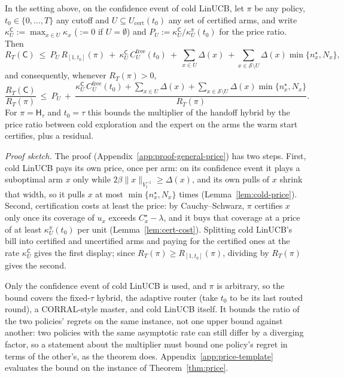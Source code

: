 \documentclass[anon]{alt2027} %
\newcommand{\Cold}{\mathsf{C}}
\newcommand{\Hyb}{\mathsf{H}}
\begin{document}
\begin{theorem}
\label{thm:general-price}
In the setting above, on the confidence event of cold LinUCB, let $\pi$ be
any policy, $t_0\in\{0,\dots,T\}$ any cutoff and $U\subseteq
U_{\mathrm{cert}}(t_0)$ any set of certified arms, and write
$\kappa^{\Cold}_U:=\max_{x\in U}\kappa_x$ ($:=0$ if $U=\emptyset$) and
$P_U:=\kappa^{\Cold}_U/\kappa^\pi_U(t_0)$ for the price ratio. Then
\[
R_T(\Cold)\ \le\ P_U\,R_{[1,t_0]}(\pi)\ +\ \kappa^{\Cold}_U\,C^{\mathrm{free}}_U(t_0)\ +\ \sum_{x\in U}\Delta(x)
\ +\sum_{x\in \mathcal S\setminus U}\Delta(x)\min\{n^\star_x,N_x\},
\]
and consequently, whenever $R_T(\pi)>0$,
\begin{equation}
\label{eq:general-price}
\frac{R_T(\Cold)}{R_T(\pi)}\ \le\ P_U\ +\
\frac{\kappa^{\Cold}_U\,C^{\mathrm{free}}_U(t_0)+\sum_{x\in U}\Delta(x)+\sum_{x\in \mathcal S\setminus U}\Delta(x)\min\{n^\star_x,N_x\}}{R_T(\pi)} .
\end{equation}
For $\pi=\Hyb_\tau$ and $t_0=\tau$ this bounds the multiplier of the handoff
hybrid by the price ratio between cold exploration and the expert on the
arms the warm start certifies, plus a residual.
\end{theorem}

\emph{Proof sketch.} The proof (Appendix~\ref{app:proof-general-price}) has
two steps. First, cold LinUCB pays its own price, once per arm: on its
confidence event it plays a suboptimal arm $x$ only while
$2\beta\|x\|_{V_t^{-1}}\ge\Delta(x)$, and its own pulls of $x$ shrink that
width, so it pulls $x$ at most $\min\{n^\star_x,N_x\}$ times
(Lemma~\ref{lem:cold-price}). Second, certification costs at least the price:
by Cauchy--Schwarz, $\pi$ certifies $x$ only once its coverage of $u_x$
exceeds $C^\star_x-\lambda$, and it buys that coverage at a price of at least
$\kappa^\pi_U(t_0)$ per unit (Lemma~\ref{lem:cert-cost}). Splitting cold
LinUCB's bill into certified and uncertified arms and paying for the
certified ones at the rate $\kappa^{\Cold}_U$ gives the first display; since
$R_T(\pi)\ge R_{[1,t_0]}(\pi)$, dividing by $R_T(\pi)$ gives the second.

Only the confidence event of cold LinUCB is used, and
$\pi$ is arbitrary, so the bound covers the fixed-$\tau$ hybrid, the adaptive
router (take $t_0$ to be its last routed round), a CORRAL-style master, and
cold LinUCB itself. It bounds the ratio of the two policies' regrets on the
same instance, not one upper bound against another: two policies with the
same asymptotic rate can still differ by a diverging factor, so a statement
about the multiplier must bound one policy's regret in terms of the other's,
as the theorem does. Appendix~\ref{app:price-template} evaluates the bound on the
instance of Theorem~\ref{thm:price}.
\end{document}
